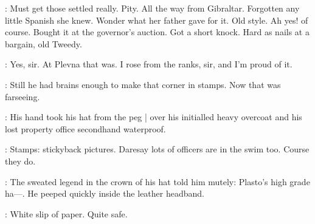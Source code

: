 \BloomInt:
Must get those settled really.
Pity.
All the way from Gibraltar.
Forgotten any little Spanish she knew.
Wonder what her father gave for it.
Old style.
Ah yes! of course.
Bought it at the governor's auction.
Got a short knock.
Hard as nails at a bargain, old Tweedy.

\Tweedy:
Yes, sir.
At Plevna that was.
I rose from the ranks, sir, and I'm proud of it.

\BloomInt:
Still he had brains enough to make that corner in stamps.
Now that was farseeing.

:
His hand took his hat from the peg |
over his initialled heavy overcoat and
his lost property office secondhand waterproof.

\BloomInt:
Stamps: stickyback pictures.
Daresay lots of officers are in the swim too.
Course they do.

:
The sweated legend in the crown of his hat told him mutely:
Plasto's high grade ha---.
He peeped quickly inside the leather headband.

\BloomInt:
White slip of paper.
Quite safe.
